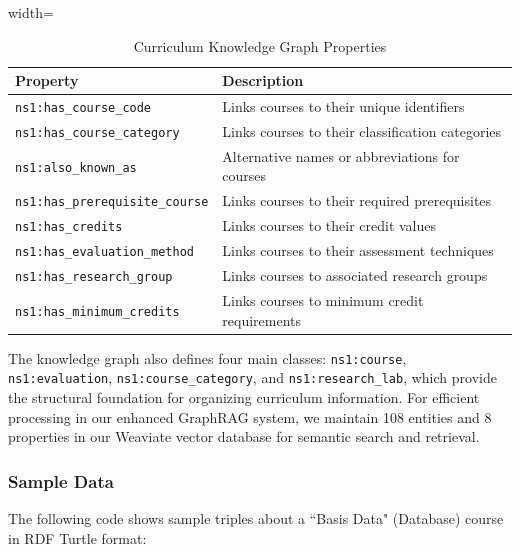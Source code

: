 \begin{table}[htbp]
\centering
\renewcommand{\arraystretch}{1.15}
\setlength{\tabcolsep}{12pt}
\caption{Curriculum Knowledge Graph Properties}
\begin{adjustbox}{width=\textwidth}
    \begin{tabular}{| m{} | m{} |}
    \hline
    \textbf{Property} & \textbf{Description} \\
    \hline
    \texttt{ns1:has\_course\_code} & Links courses to their unique identifiers \\
    \hline
    \texttt{ns1:has\_course\_category} & Links courses to their classification categories \\
    \hline
    \texttt{ns1:also\_known\_as} & Alternative names or abbreviations for courses \\
    \hline
    \texttt{ns1:has\_prerequisite\_course} & Links courses to their required prerequisites \\
    \hline
    \texttt{ns1:has\_credits} & Links courses to their credit values \\
    \hline
    \texttt{ns1:has\_evaluation\_method} & Links courses to their assessment techniques \\
    \hline
    \texttt{ns1:has\_research\_group} & Links courses to associated research groups \\
    \hline
    \texttt{ns1:has\_minimum\_credits} & Links courses to minimum credit requirements \\
    \hline
    \end{tabular}
\end{adjustbox}
\label{table-curriculum-properties}
\end{table}

The knowledge graph also defines four main classes: \texttt{ns1:course}, \texttt{ns1:evaluation}, \texttt{ns1:course\_category}, and \texttt{ns1:research\_lab}, which provide the structural foundation for organizing curriculum information. For efficient processing in our enhanced GraphRAG system, we maintain 108 entities and 8 properties in our Weaviate vector database for semantic search and retrieval.

\subsubsection{Sample Data}
The following code shows sample triples about a ``Basis Data" (Database) course in RDF Turtle format:




